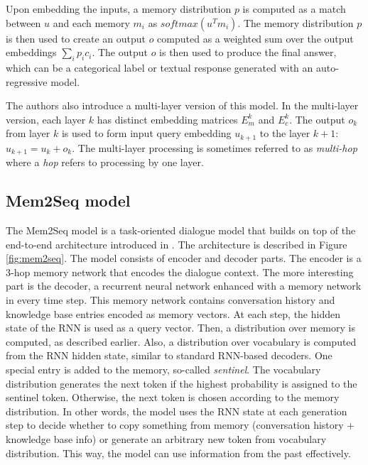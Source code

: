 Upon embedding the inputs, a memory distribution $p$ is computed as a match between $u$ and each memory $m_i$ as $softmax (u^Tm_i)$.
The memory distribution $p$ is then used to create an output $o$ computed as a weighted sum over the output embeddings $\sum_i p_ic_i$.
The output $o$ is then used to produce the final answer, which can be a categorical label or textual response generated with an auto-regressive model.

The authors also introduce a multi-layer version of this model.
In the multi-layer version, each layer $k$ has distinct embedding matrices $E^k_m$ and $E^k_c$. The output $o_k$ from layer $k$ is used to form input query embedding $u_{k+1}$ to the layer $k+1$: $u_{k+1} = u_k + o_k$.
The multi-layer processing is sometimes referred to as \emph{multi-hop} where a \emph{hop} refers to processing by one layer.

\subsection{Mem2Seq model}
\label{02:sec:mem2seq}
The Mem2Seq model \cite{madotto-etal-2018-mem2seq} is a task-oriented dialogue model that builds on top of the end-to-end architecture introduced in \citet{sukhbaatar2015end}.
The architecture is described in Figure \ref{fig:mem2seq}.
The model consists of encoder and decoder parts.
The encoder is a 3-hop memory network that encodes the dialogue context.
The more interesting part is the decoder, a recurrent neural network enhanced with a memory network in every time step.
This memory network contains conversation history and knowledge base entries encoded as memory vectors.
At each step, the hidden state of the RNN is used as a query vector. Then, a distribution over memory is computed, as described earlier. 
Also, a distribution over vocabulary is computed from the RNN hidden state, similar to standard RNN-based decoders.
One special entry is added to the memory, so-called \emph{sentinel}.
The vocabulary distribution generates the next token if the highest probability is assigned to the sentinel token.
Otherwise, the next token is chosen according to the memory distribution.
In other words, the model uses the RNN state at each generation step to decide whether to copy something from memory (conversation history + knowledge base info) or generate an arbitrary new token from vocabulary distribution.
This way, the model can use information from the past effectively.

